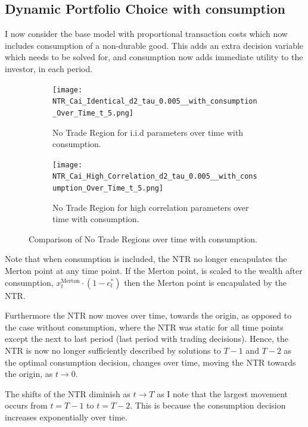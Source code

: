 \documentclass[11pt]{article}
\begin{document}
\subsection{Dynamic Portfolio Choice with consumption} \label{Subsection: Results_WithConsumption}
I now consider the base model with proportional transaction costs which now includes consumption of a non-durable good.
This adds an extra decision variable which needs to be solved for, and consumption now adds immediate utility to the investor, in each period.
\begin{figure}[!ht]
    \centering
    \begin{subfigure}[t]{0.48\textwidth}
        \centering
        \texttt{[image: NTR\_Cai\_Identical\_d2\_tau\_0.005\_\_with\_consumption\_Over\_Time\_t\_5.png]}
        \caption{No Trade Region for i.i.d parameters over time with consumption.}
        \label{fig:NTR_2d_iid_with_consumption_over_time}
    \end{subfigure}%
    \hfill
    \begin{subfigure}[t]{0.48\textwidth}
        \centering
        \texttt{[image: NTR\_Cai\_High\_Correlation\_d2\_tau\_0.005\_\_with\_consumption\_Over\_Time\_t\_5.png]}
        \caption{No Trade Region for high correlation parameters over time with consumption.}
        \label{fig:NTR_2d_high_correlation_with_consumption_over_time}
    \end{subfigure}
    \caption{Comparison of No Trade Regions over time with consumption.}
\end{figure}

Note that when consumption is included, the \ac{NTR} no longer encapulates the Merton point at any time point.
If the Merton point, is scaled to the wealth after consumption, $x^{\text{Merton}}_{t}\cdot(1-c^{*}_{t})$ then the Merton point is encapulated by the \ac{NTR}.

Furthermore the \ac{NTR} now moves over time, towards the origin, as opposed to the case without consumption,
where the \ac{NTR} was static for all time points except the next to last period (last period with trading decisions).
Hence, the \ac{NTR} is now no longer sufficiently described by solutions to $T-1$ and $T-2$ as the optimal consumption decision,
changes over time, moving the NTR towards the origin, as $t \rightarrow 0$.

The shifts of the NTR diminish as $t \to T$ as I note that the largest movement occurs from $t=T-1$ to $t=T-2$.
This is because the consumption decision increases exponentially over time.
\end{document}
